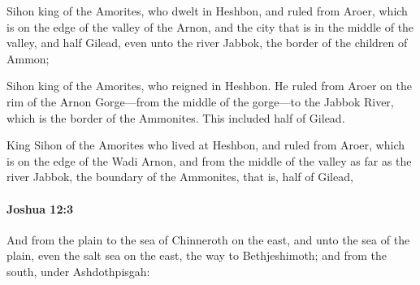 			\begin{versebox}
					\item[BHS] 
					\item[ASV] Sihon king of the Amorites, who dwelt in Heshbon, and ruled from Aroer, which is on the edge of the valley of the Arnon, and the city that is in the middle of the valley, and half Gilead, even unto the river Jabbok, the border of the children of Ammon;
					\item[NIV] Sihon king of the Amorites, who reigned in Heshbon. He ruled from Aroer on the rim of the Arnon Gorge—from the middle of the gorge—to the Jabbok River, which is the border of the Ammonites. This included half of Gilead.
					\item[NRSV] King Sihon of the Amorites who lived at Heshbon, and ruled from Aroer, which is on the edge of the Wadi Arnon, and from the middle of the valley as far as the river Jabbok, the boundary of the Ammonites, that is, half of Gilead,
			\end{versebox}

		\paragraph{Joshua 12:3} %
			\label{JOSHUA-12-3}

			And from the plain to the sea of Chinneroth on the east, and unto the sea of the plain, even the salt sea on the east, the way to Bethjeshimoth; and from the south, under Ashdothpisgah:

